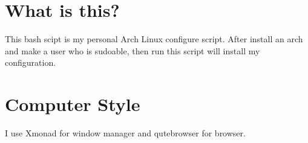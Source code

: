 \documentclass{coprime}
\begin{document}
\section{What is this?}
This bash scipt is my personal Arch Linux configure script.
After install an arch and make a user who is sudoable, then run this script will install my configuration.

\section{Computer Style}
I use Xmonad for window manager and qutebrowser for browser.
\end{document}
